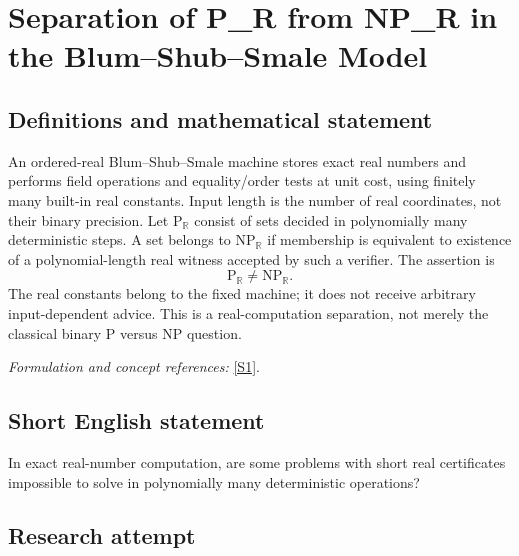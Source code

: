 \documentclass[11pt,a4paper]{article}
\newcommand{\R}{\mathbb{R}}
\newcommand{\sref}[2]{\hyperlink{source:#1:#2}{[S#2]}}
\newif\ifshowcatalogue
\newcommand{\cataloguescope}[1]{\ifshowcatalogue
 \paragraph{Exact scope in the supplied catalogue.}
 \begin{quote}\small #1\end{quote}\fi}
\numberwithin{equation}{section}
\begin{document}
\setcounter{section}{0}
\clearpage
\section*{\texorpdfstring{Separation of P\_R from NP\_R in the Blum–Shub–Smale Model}{Separation of P\_R from NP\_R in the Blum–Shub–Smale Model}}\label{30006767}
\subsection{Definitions and mathematical statement}
An ordered-real Blum--Shub--Smale machine stores exact real numbers and performs field operations and equality/order tests at unit cost, using finitely many built-in real constants. Input length is the number of real coordinates, not their binary precision. Let $\mathrm P_{\R}$ consist of sets decided in polynomially many deterministic steps. A set belongs to $\mathrm{NP}_{\R}$ if membership is equivalent to existence of a polynomial-length real witness accepted by such a verifier. The assertion is
\[
 \mathrm P_{\R}\ne\mathrm{NP}_{\R}.
\]
The real constants belong to the fixed machine; it does not receive arbitrary input-dependent advice. This is a real-computation separation, not merely the classical binary $\mathrm P$ versus $\mathrm{NP}$ question.
\par\smallskip\textit{Formulation and concept references:} \sref{30006767}{1}.
\cataloguescope{In the standard ordered-real Blum–Shub–Smale model, machines use finitely many built-in real constants, real-valued registers, exact field operations (+,-,multiplication,division where defined) and order/equality tests at unit cost. Inputs are finite real vectors and size is vector length. Let P\_R be decision problems solved by deterministic machines in polynomially many steps, and NP\_R those with polynomial-length real witnesses verifiable in P\_R. The assertion is P\_R != NP\_R.}
\subsection{Short English statement}
In exact real-number computation, are some problems with short real certificates impossible to solve in polynomially many deterministic operations?
\subsection{Research attempt}
\end{document}
